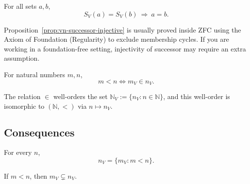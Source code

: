 \begin{proposition}
\label{prop:vn-successor-injective}
For all sets $a,b$,
\[
S_V(a)=S_V(b)\ \Rightarrow\ a=b.
\]
\end{proposition}



\begin{remark}
Proposition~\ref{prop:vn-successor-injective} is usually proved inside ZFC using the
Axiom of Foundation (Regularity) to exclude membership cycles.
If you are working in a foundation-free setting, injectivity of successor may require an extra assumption.
\end{remark}

\begin{proposition}
\label{prop:vn-order-by-membership}
For natural numbers $m,n$,
\[
m<n \iff m_V \in n_V.
\]
\end{proposition}



\begin{proposition}
\label{prop:vn-well-ordered}
The relation $\in$ well-orders the set $\mathbb{N}_V := \{n_V : n\in\mathbb{N}\}$,
and this well-order is isomorphic to $(\mathbb{N},<)$ via $n\mapsto n_V$.
\end{proposition}



\subsection*{Consequences}

\begin{corollary}
\label{cor:vn-predecessors}
For every $n$,
\[
n_V = \{m_V : m<n\}.
\]
\end{corollary}



\begin{corollary}
\label{cor:vn-monotone}
If $m<n$, then $m_V \subsetneq n_V$.
\end{corollary}


